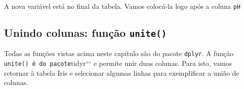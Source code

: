 \documentclass[
]{book}
\newenvironment{Shaded}{\begin{snugshade}}{\end{snugshade}}
\newcommand{\DataTypeTok}[1]{\textcolor[rgb]{0.13,0.29,0.53}{#1}}
\newcommand{\DecValTok}[1]{\textcolor[rgb]{0.00,0.00,0.81}{#1}}
\newcommand{\FloatTok}[1]{\textcolor[rgb]{0.00,0.00,0.81}{#1}}
\newcommand{\KeywordTok}[1]{\textcolor[rgb]{0.13,0.29,0.53}{\textbf{#1}}}
\newcommand{\NormalTok}[1]{#1}
\newcommand{\OperatorTok}[1]{\textcolor[rgb]{0.81,0.36,0.00}{\textbf{#1}}}
\newcommand{\StringTok}[1]{\textcolor[rgb]{0.31,0.60,0.02}{#1}}
\begin{document}
A nova variável está no final da tabela. Vamos colocá-la logo após a coluna \texttt{pH}

\begin{Shaded}
\end{Shaded}

\hypertarget{unindo-colunas-funuxe7uxe3o-unite}{%
\subsection{\texorpdfstring{Unindo colunas: função \texttt{unite()}}{Unindo colunas: função unite()}}\label{unindo-colunas-funuxe7uxe3o-unite}}

Todas as funções vistas acima neste capítulo são do pacote \texttt{dplyr}. A função \texttt{unite()\ é\ do\ pacote}tidyr``` e permite unir duas colunas. Para isto, vamos retornar à tabela Iris e selecionar algumas linhas para exemplificar a união de colunas.

\begin{Shaded}
\end{Shaded}
\end{document}
